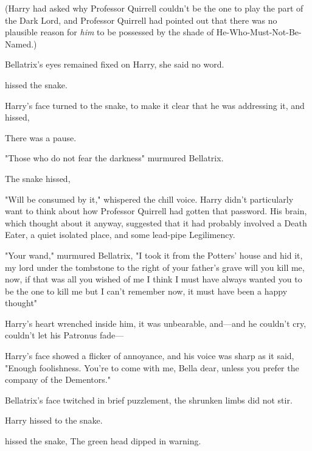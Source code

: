 (Harry had asked why Professor Quirrell couldn't be the one to play the part of
the Dark Lord, and Professor Quirrell had pointed out that there was no
plausible reason for \emph{him} to be possessed by the shade of
He-Who-Must-Not-Be-Named.)

Bellatrix's eyes remained fixed on Harry, she said no word.

 hissed the snake.

Harry's face turned to the snake, to make it clear that he was addressing it,
and hissed, 

There was a pause.

"Those who do not fear the darkness{\el}" murmured Bellatrix.

The snake hissed, 

"Will be consumed by it," whispered the chill voice. Harry didn't particularly
want to think about how Professor Quirrell had gotten that password. His brain,
which thought about it anyway, suggested that it had probably involved a Death
Eater, a quiet isolated place, and some lead-pipe Legilimency.

"Your wand," murmured Bellatrix, "I took it from the Potters' house and hid it,
my lord{\el} under the tombstone to the right of your father's grave{\el}
will you kill me, now, if that was all you wished of me{\el} I think I must
have always wanted you to be the one to kill me{\el} but I can't remember
now, it must have been a happy thought{\el}"

Harry's heart wrenched inside him, it was unbearable, and---and he couldn't
cry, couldn't let his Patronus fade---

Harry's face showed a flicker of annoyance, and his voice was sharp as it said,
"Enough foolishness. You're to come with me, Bella dear, unless you prefer the
company of the Dementors."

Bellatrix's face twitched in brief puzzlement, the shrunken limbs did not stir.

 Harry hissed to the snake. 

 hissed the snake,  The green head dipped in warning.

